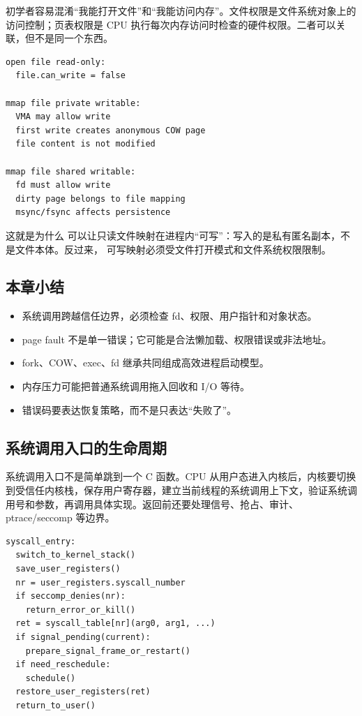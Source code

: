 初学者容易混淆“我能打开文件”和“我能访问内存”。文件权限是文件系统对象上的访问控制；页表权限是 CPU 执行每次内存访问时检查的硬件权限。二者可以关联，但不是同一个东西。

\begin{lstlisting}
open file read-only:
  file.can_write = false

mmap file private writable:
  VMA may allow write
  first write creates anonymous COW page
  file content is not modified

mmap file shared writable:
  fd must allow write
  dirty page belongs to file mapping
  msync/fsync affects persistence
\end{lstlisting}

这就是为什么  可以让只读文件映射在进程内“可写”：写入的是私有匿名副本，不是文件本体。反过来， 可写映射必须受文件打开模式和文件系统权限限制。

\subsection{本章小结}

\begin{itemize}
\tightlist
\item 系统调用跨越信任边界，必须检查 fd、权限、用户指针和对象状态。
\item page fault 不是单一错误；它可能是合法懒加载、权限错误或非法地址。
\item fork、COW、exec、fd 继承共同组成高效进程启动模型。
\item 内存压力可能把普通系统调用拖入回收和 I/O 等待。
\item 错误码要表达恢复策略，而不是只表达“失败了”。
\end{itemize}

\subsection{系统调用入口的生命周期}

系统调用入口不是简单跳到一个 C 函数。CPU 从用户态进入内核后，内核要切换到受信任内核栈，保存用户寄存器，建立当前线程的系统调用上下文，验证系统调用号和参数，再调用具体实现。返回前还要处理信号、抢占、审计、ptrace/seccomp 等边界。

\begin{lstlisting}
syscall_entry:
  switch_to_kernel_stack()
  save_user_registers()
  nr = user_registers.syscall_number
  if seccomp_denies(nr):
    return_error_or_kill()
  ret = syscall_table[nr](arg0, arg1, ...)
  if signal_pending(current):
    prepare_signal_frame_or_restart()
  if need_reschedule:
    schedule()
  restore_user_registers(ret)
  return_to_user()
\end{lstlisting}

